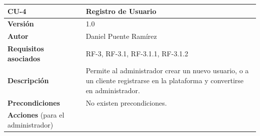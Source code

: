 \begin{longtable}[H]{@{}ll@{}}
\toprule
\begin{minipage}[b]{0.23\columnwidth}\raggedright\strut
\textbf{CU-4}\strut
\end{minipage} & \begin{minipage}[b]{0.71\columnwidth}\raggedright\strut
\textbf{Registro de Usuario}\strut
\end{minipage}\tabularnewline
\midrule
\endhead
\begin{minipage}[t]{0.23\columnwidth}\raggedright\strut
\textbf{Versión}\strut
\end{minipage} & \begin{minipage}[t]{0.71\columnwidth}\raggedright\strut
1.0\strut
\end{minipage}\tabularnewline
\begin{minipage}[t]{0.23\columnwidth}\raggedright\strut
\textbf{Autor}\strut
\end{minipage} & \begin{minipage}[t]{0.71\columnwidth}\raggedright\strut
Daniel Puente Ramírez\strut
\end{minipage}\tabularnewline
\begin{minipage}[t]{0.23\columnwidth}\raggedright\strut
\textbf{Requisitos asociados}\strut
\end{minipage} & \begin{minipage}[t]{0.71\columnwidth}\raggedright\strut
RF-3, RF-3.1, RF-3.1.1, RF-3.1.2\strut
\end{minipage}\tabularnewline
\begin{minipage}[t]{0.23\columnwidth}\raggedright\strut
\textbf{Descripción}\strut
\end{minipage} & \begin{minipage}[t]{0.71\columnwidth}\raggedright\strut
Permite al administrador crear un nuevo usuario, o a un cliente registrarse en la plataforma y convertirse en administrador.\strut
\end{minipage}\tabularnewline
\begin{minipage}[t]{0.23\columnwidth}\raggedright\strut
\textbf{Precondiciones}\strut
\end{minipage} & \begin{minipage}[t]{0.71\columnwidth}\raggedright\strut
No existen precondiciones.\strut
\end{minipage}\tabularnewline
\begin{minipage}[t]{0.23\columnwidth}\raggedright\strut
\textbf{Acciones} (para el administrador)\strut

\end{minipage}
\end{longtable}
